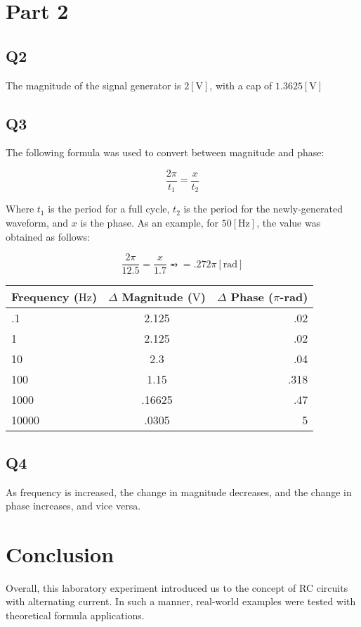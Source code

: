 \documentclass[
	letterpaper, %
	10pt, %
]{CSUniSchoolLabReport}
\begin{document}
  \section{Part 2}

  \subsection{Q2} The magnitude of the signal generator is $2[\si{\volt}]$, with a cap of $1.3625[\si{\volt}]$

  \subsection{Q3} The following formula was used to convert between magnitude and phase:

  $$\frac{2\pi}{t_1}=\frac{x}{t_2}$$

  Where $t_1$ is the period for a full cycle, $t_2$ is the period for the newly-generated waveform, and $x$ is the phase. As an example, for $50[\si{\hertz}]$, the value was obtained as follows:

  $$\frac{2\pi}{12.5}=\frac{x}{1.7}\rightarrowx=.272\pi[\text{rad}]$$

  \begin{center}
    \begin{tabular}[h!]{l c r}
      Frequency ($\si{\hertz}$) & $\Delta$ Magnitude ($\si{\volt}$)& $\Delta$ Phase ($\pi$-rad)\\
      \hline
      .1 & 2.125 & .02\\
      1 & 2.125 & .02\\
      10 & 2.3 & .04\\
      100 & 1.15 & .318\\
      1000 & .16625 & .47\\
      10000 & .0305 & 5\\
    \end{tabular}
  \end{center}

  \subsection{Q4} As frequency is increased, the change in magnitude decreases, and the change in phase increases, and vice versa.

\section{Conclusion}

Overall, this laboratory experiment introduced us to the concept of RC circuits with alternating current. In such a manner, real-world examples were tested with theoretical formula applications.
\end{document}
